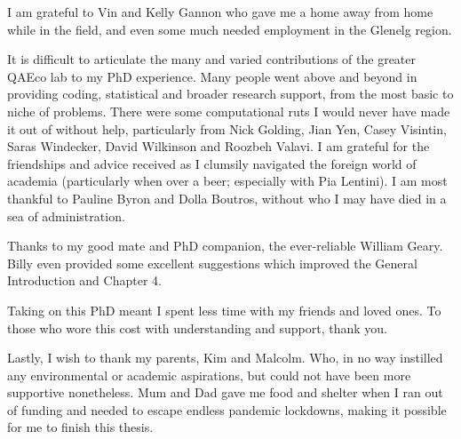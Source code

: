 \documentclass[11pt,a4paper,titlepage,twoside,openright]{style/unimelbthesis}
\begin{document}
\begin{frontmatter}
\begin{acknowledgements}
    I am grateful to Vin and Kelly Gannon who gave me a home away from home while in the field, and even some much needed employment in the Glenelg region.

    It is difficult to articulate the many and varied contributions of the greater QAEco lab to my PhD experience. Many people went above and beyond in providing coding, statistical and broader research support, from the most basic to niche of problems. There were some computational ruts I would never have made it out of without help, particularly from Nick Golding, Jian Yen, Casey Visintin, Saras Windecker, David Wilkinson and Roozbeh Valavi. I am grateful for the friendships and advice received as I clumsily navigated the foreign world of academia (particularly when over a beer; especially with Pia Lentini). I am most thankful to Pauline Byron and Dolla Boutros, without who I may have died in a sea of administration.

    Thanks to my good mate and PhD companion, the ever-reliable William Geary. Billy even provided some excellent suggestions which improved the General Introduction and Chapter 4.

    Taking on this PhD meant I spent less time with my friends and loved ones. To those who wore this cost with understanding and support, thank you.

    Lastly, I wish to thank my parents, Kim and Malcolm. Who, in no way instilled any environmental or academic aspirations, but could not have been more supportive nonetheless. Mum and Dad gave me food and shelter when I ran out of funding and needed to escape endless pandemic lockdowns, making it possible for me to finish this thesis.
  \end{acknowledgements}

  \hypersetup{linkcolor=black}
  \setcounter{tocdepth}{2}
  \tableofcontents


  \listoftables


  \listoffigures


%
\end{frontmatter}
%
\end{document}
